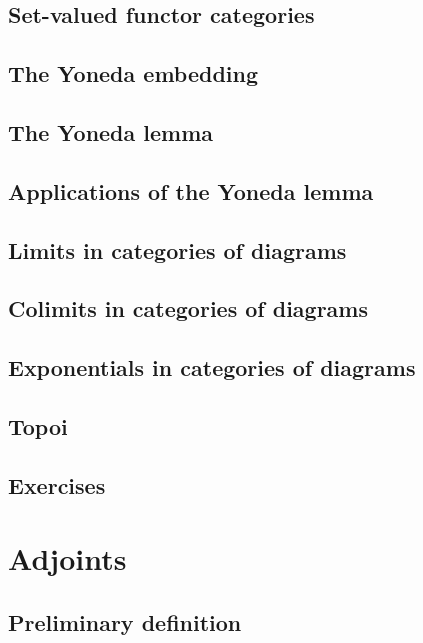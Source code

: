 \documentclass[uplatex, dvipdfmx]{jsarticle}
\begin{document}
\subsection{Set-valued functor categories}

\subsection{The Yoneda embedding}

\subsection{The Yoneda lemma}

\subsection{Applications of the Yoneda lemma}

\subsection{Limits in categories of diagrams}

\subsection{Colimits in categories of diagrams}

\subsection{Exponentials in categories of diagrams}

\subsection{Topoi}

\subsection{Exercises}

\section{Adjoints}

\subsection{Preliminary definition}
\end{document}
